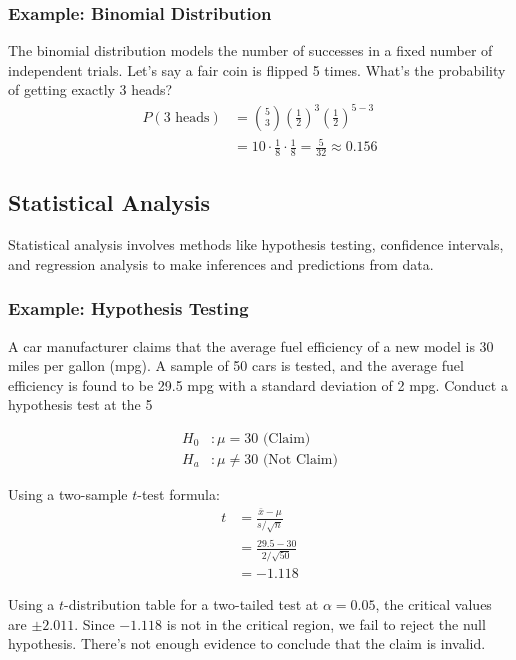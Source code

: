 \documentclass{article}
\begin{document}
\subsubsection{Example: Binomial Distribution}
The binomial distribution models the number of successes in a fixed number of independent trials. Let's say a fair coin is flipped 5 times. What's the probability of getting exactly 3 heads?
\begin{align*}
    P(\text{3 heads}) &= \binom{5}{3} \left(\frac{1}{2}\right)^3 \left(\frac{1}{2}\right)^{5 - 3} \\
    &= 10 \cdot \frac{1}{8} \cdot \frac{1}{8} = \frac{5}{32} \approx 0.156
\end{align*}

\subsection{Statistical Analysis}
Statistical analysis involves methods like hypothesis testing, confidence intervals, and regression analysis to make inferences and predictions from data.

\subsubsection{Example: Hypothesis Testing}
A car manufacturer claims that the average fuel efficiency of a new model is 30 miles per gallon (mpg). A sample of 50 cars is tested, and the average fuel efficiency is found to be 29.5 mpg with a standard deviation of 2 mpg. Conduct a hypothesis test at the 5%

\begin{align*}
    H_0 &: \mu = 30 \text{ (Claim)} \\
    H_a &: \mu \neq 30 \text{ (Not Claim)}
\end{align*}

Using a two-sample $t$-test formula:
\begin{align*}
    t &= \frac{\bar{x} - \mu}{s/\sqrt{n}} \\
    &= \frac{29.5 - 30}{2/\sqrt{50}} \\
    &= -1.118
\end{align*}

Using a $t$-distribution table for a two-tailed test at $\alpha = 0.05$, the critical values are $\pm 2.011$. Since $-1.118$ is not in the critical region, we fail to reject the null hypothesis. There's not enough evidence to conclude that the claim is invalid.
\end{document}
